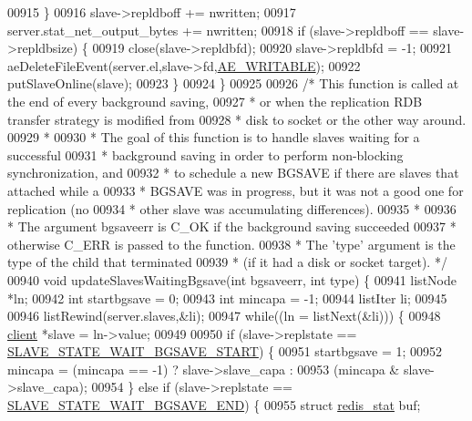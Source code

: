 \begin{DoxyCode}
{{{{{{{{{{{{{{{{{{{{{{{{{{{{{{{{{{{{{00915     \}
00916     slave->repldboff += nwritten;
00917     server.stat\_net\_output\_bytes += nwritten;
00918     \textcolor{keywordflow}{if} (slave->repldboff == slave->repldbsize) \{
00919         close(slave->repldbfd);
00920         slave->repldbfd = -1;
00921         aeDeleteFileEvent(server.el,slave->fd,\hyperlink{ae_8h_ab6bfb0366ccb6277112d132c2a2bf500}{AE\_WRITABLE});
00922         putSlaveOnline(slave);
00923     \}
00924 \}
00925 
00926 \textcolor{comment}{/* This function is called at the end of every background saving,}
00927 \textcolor{comment}{ * or when the replication RDB transfer strategy is modified from}
00928 \textcolor{comment}{ * disk to socket or the other way around.}
00929 \textcolor{comment}{ *}
00930 \textcolor{comment}{ * The goal of this function is to handle slaves waiting for a successful}
00931 \textcolor{comment}{ * background saving in order to perform non-blocking synchronization, and}
00932 \textcolor{comment}{ * to schedule a new BGSAVE if there are slaves that attached while a}
00933 \textcolor{comment}{ * BGSAVE was in progress, but it was not a good one for replication (no}
00934 \textcolor{comment}{ * other slave was accumulating differences).}
00935 \textcolor{comment}{ *}
00936 \textcolor{comment}{ * The argument bgsaveerr is C\_OK if the background saving succeeded}
00937 \textcolor{comment}{ * otherwise C\_ERR is passed to the function.}
00938 \textcolor{comment}{ * The 'type' argument is the type of the child that terminated}
00939 \textcolor{comment}{ * (if it had a disk or socket target). */}
00940 \textcolor{keywordtype}{void} updateSlavesWaitingBgsave(\textcolor{keywordtype}{int} bgsaveerr, \textcolor{keywordtype}{int} type) \{
00941     listNode *ln;
00942     \textcolor{keywordtype}{int} startbgsave = 0;
00943     \textcolor{keywordtype}{int} mincapa = -1;
00944     listIter li;
00945 
00946     listRewind(server.slaves,&li);
00947     \textcolor{keywordflow}{while}((ln = listNext(&li))) \{
00948         \hyperlink{structclient}{client} *slave = ln->value;
00949 
00950         \textcolor{keywordflow}{if} (slave->replstate == \hyperlink{server_8h_a170ee2dd8cfefaf0d112edcc3152f8d7}{SLAVE\_STATE\_WAIT\_BGSAVE\_START}) \{
00951             startbgsave = 1;
00952             mincapa = (mincapa == -1) ? slave->slave\_capa :
00953                                         (mincapa & slave->slave\_capa);
00954         \} \textcolor{keywordflow}{else} \textcolor{keywordflow}{if} (slave->replstate == \hyperlink{server_8h_a2a1b586e8f326f831f6ab466c8c3f38a}{SLAVE\_STATE\_WAIT\_BGSAVE\_END}) \{
00955             \textcolor{keyword}{struct} \hyperlink{config_8h_ae18037d20ab1bc7c716ea0bcb506f7af}{redis\_stat} buf;
}}}}}}}}}}}}}}}}}}}}}}}}}}}}}}}}}}}}}
\end{DoxyCode}
